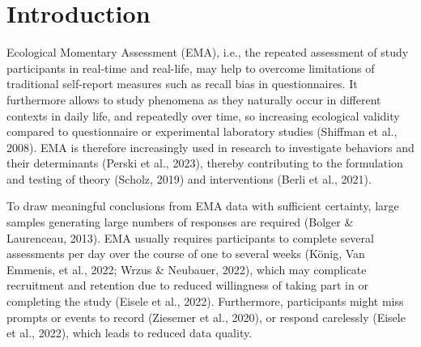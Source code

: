 \documentclass[authordate, empirical]{jote-new-article}
\author[1]{\mbox{Helge Giese\orcid{0000-0001-7609-0215}}}
\affil[1]{Charité}
\author[2]{\mbox{Laura M König\orcid{0000-0003-3655-8842}}}
\affil[2]{University of Vienna}
\begin{document}
\begin{frontmatter}
  \maketitle
  \begin{abstract}
    \printabstracttext
  \end{abstract}
\end{frontmatter}









	







	\section{Introduction}



	Ecological Momentary Assessment (EMA), i.e., the repeated assessment of study participants in real-time and real-life, may help to overcome limitations of traditional self-report measures such as recall bias in questionnaires. It furthermore allows to study phenomena as they naturally occur in different contexts in daily life, and repeatedly over time, so increasing ecological validity compared to questionnaire or experimental laboratory studies (Shiffman et al., 2008). EMA is therefore increasingly used in research to investigate behaviors and their determinants (Perski et al., 2023), thereby contributing to the formulation and testing of theory (Scholz, 2019) and interventions (Berli et al., 2021).



	To draw meaningful conclusions from EMA data with sufficient certainty, large samples generating large numbers of responses are required (Bolger \& Laurenceau, 2013). EMA usually requires participants to complete several assessments per day over the course of one to several weeks (König, Van Emmenis, et al., 2022; Wrzus \& Neubauer, 2022), which may complicate recruitment and retention due to reduced willingness of taking part in or completing the study (Eisele et al., 2022). Furthermore, participants might miss prompts or events to record (Ziesemer et al., 2020), or respond carelessly (Eisele et al., 2022), which leads to reduced data quality.
\end{document}
